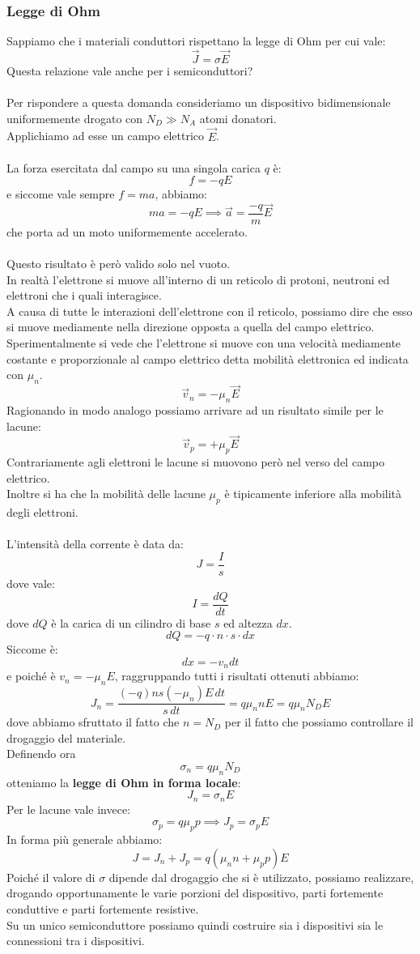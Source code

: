 \documentclass{article}
\numberwithin{equation}{subsection}
\begin{document}
	\subsubsection{Legge di Ohm}
	Sappiamo che i materiali conduttori rispettano la legge di Ohm per cui vale:
	$$\vec{J} = \sigma \vec{E}$$
	Questa relazione vale anche per i semiconduttori?\\\\
	Per rispondere a questa domanda consideriamo un dispositivo bidimensionale uniformemente drogato con $N_D \gg N_A$ atomi donatori. \\
	Applichiamo ad esse un campo elettrico $\vec{E}$.\\\\
	La forza esercitata dal campo su una singola carica $q$ è:
	$$f = -qE$$
	e siccome vale sempre $f = ma$, abbiamo:
	$$ma = -qE \implies \vec{a} = \frac{-q}{m} \vec{E}$$
	che porta ad un moto uniformemente accelerato.\\\\
	Questo risultato è però valido solo nel vuoto. \\
	In realtà l’elettrone si muove all’interno di un reticolo di protoni, neutroni ed elettroni che i quali interagisce. \\
	A causa di tutte le interazioni dell’elettrone con il reticolo, possiamo dire che esso si muove mediamente nella direzione opposta a quella del campo elettrico. \\
	Sperimentalmente si vede che l’elettrone si muove con una velocità mediamente costante e proporzionale al campo elettrico detta mobilità elettronica ed indicata con $\mu_n$.
	$$\vec{v}_n = -\mu_n \vec{E}$$
	Ragionando in modo analogo possiamo arrivare ad un risultato simile per le lacune:
	$$\vec{v}_p = +\mu_p \vec{E}$$
	Contrariamente agli elettroni le lacune si muovono però nel verso del campo elettrico. \\
	Inoltre si ha che la mobilità delle lacune $\mu_p$ è tipicamente inferiore alla mobilità degli elettroni.\\\\
	L’intensità della corrente è data da:
	$$J = \frac{I}{s}$$
	dove vale:
	$$I = \frac{dQ}{dt}$$
	dove $dQ$ è la carica di un cilindro di base $s$ ed altezza $dx$.
	$$dQ = -q \cdot n \cdot s \cdot dx$$
	Siccome è:
	$$dx = -v_n dt$$
	e poiché è $v_n = -\mu_n E$, raggruppando tutti i risultati ottenuti abbiamo:
	$$J_n = \frac{(-q)ns(-\mu_n)E \, dt}{s \, dt} = q\mu_n nE = q\mu_n N_D E$$
	dove abbiamo sfruttato il fatto che $n = N_D$ per il fatto che possiamo controllare il drogaggio del materiale. \\
	Definendo ora
	$$\sigma_n = q\mu_n N_D$$
	otteniamo la \textbf{legge di Ohm in forma locale}:
	$$J_n = \sigma_n E$$
	Per le lacune vale invece:
	$$\sigma_p = q\mu_p p \implies J_p = \sigma_p E$$
	In forma più generale abbiamo:
	$$J = J_n + J_p = q(\mu_n n + \mu_p p)E$$
	Poiché il valore di $\sigma$ dipende dal drogaggio che si è utilizzato, possiamo realizzare, drogando opportunamente le varie porzioni del dispositivo, parti fortemente conduttive e parti fortemente resistive. \\
	Su un unico semiconduttore possiamo quindi costruire sia i dispositivi sia le connessioni tra i dispositivi.
\end{document}
